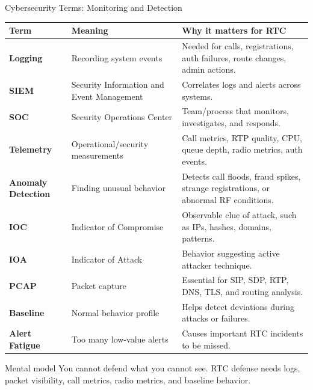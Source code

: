 \documentclass[aspectratio=169]{beamer}
\begin{document}
\begin{frame}{Cybersecurity Terms: Monitoring and Detection}
\tiny
\begin{tabular}{p{2.2cm} p{3.5cm} p{6.5cm}}
\toprule
\textbf{Term} & \textbf{Meaning} & \textbf{Why it matters for RTC} \\
\midrule
\textbf{Logging} & Recording system events & Needed for calls, registrations, auth failures, route changes, admin actions. \\
\textbf{SIEM} & Security Information and Event Management & Correlates logs and alerts across systems. \\
\textbf{SOC} & Security Operations Center & Team/process that monitors, investigates, and responds. \\
\textbf{Telemetry} & Operational/security measurements & Call metrics, RTP quality, CPU, queue depth, radio metrics, auth events. \\
\textbf{Anomaly Detection} & Finding unusual behavior & Detects call floods, fraud spikes, strange registrations, or abnormal RF conditions. \\
\textbf{IOC} & Indicator of Compromise & Observable clue of attack, such as IPs, hashes, domains, patterns. \\
\textbf{IOA} & Indicator of Attack & Behavior suggesting active attacker technique. \\
\textbf{PCAP} & Packet capture & Essential for SIP, SDP, RTP, DNS, TLS, and routing analysis. \\
\textbf{Baseline} & Normal behavior profile & Helps detect deviations during attacks or failures. \\
\textbf{Alert Fatigue} & Too many low-value alerts & Causes important RTC incidents to be missed. \\
\bottomrule
\end{tabular}

\vspace{0.15cm}
\begin{block}{Mental model}
You cannot defend what you cannot see. RTC defense needs logs, packet visibility, call metrics, radio metrics, and baseline behavior.
\end{block}
\end{frame}
\end{document}
